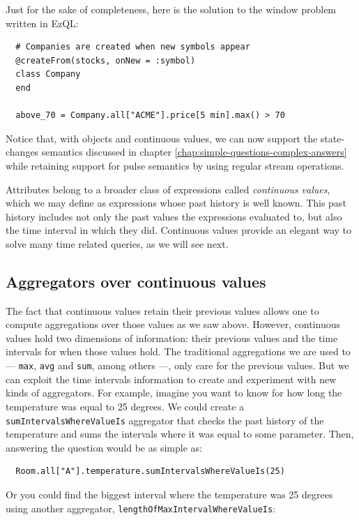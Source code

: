 \documentclass{report}
\begin{document}
Just for the sake of completeness, here is the solution to the window
problem written in EzQL:

\begin{lstlisting}
  # Companies are created when new symbols appear
  @createFrom(stocks, onNew = :symbol)
  class Company
  end

  above_70 = Company.all["ACME"].price[5 min].max() > 70
\end{lstlisting}

Notice that, with objects and continuous values, we can now support
the state-changes semantics discussed in chapter
\ref{chap:simple-questions-complex-answers} while retaining support
for pulse semantics by using regular stream operations.

Attributes belong to a broader class of expressions called
\emph{continuous values}, which we may define as expressions whose
past history is well known. This past history includes not only the
past values the expressions evaluated to, but also the time interval
in which they did. Continuous values provide an elegant way to solve
many time related queries, as we will see next.

\subsection{Aggregators over continuous values}

The fact that continuous values retain their previous values allows
one to compute aggregations over those values as we saw
above. However, continuous values hold two dimensions of information:
their previous values and the time intervals for when those values
hold. The traditional aggregations we are used to --- \verb=max=,
\verb=avg= and \verb=sum=, among others ---, only care for the
previous values. But we can exploit the time intervals information to
create and experiment with new kinds of aggregators. For example,
imagine you want to know for how long the temperature was equal to 25
degrees. We could create a \verb=sumIntervalsWhereValueIs= aggregator
that checks the past history of the temperature and sums the intervals
where it was equal to some parameter. Then, answering the question
would be as simple as:

\begin{lstlisting}
  Room.all["A"].temperature.sumIntervalsWhereValueIs(25)
\end{lstlisting}

Or you could find the biggest interval where the temperature was 25
degrees using another aggregator,
\verb=lengthOfMaxIntervalWhereValueIs=:
\end{document}
